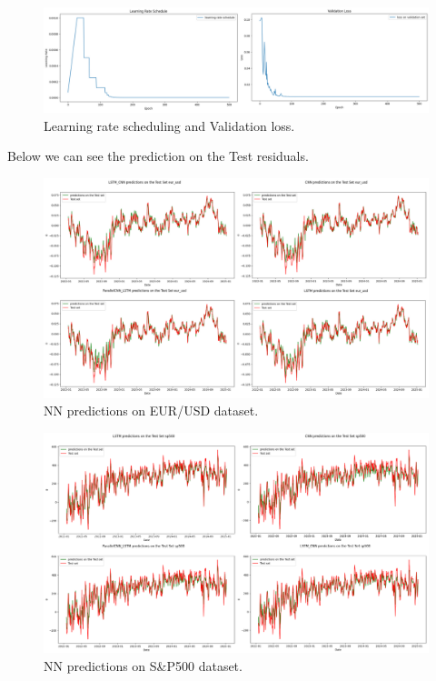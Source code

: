   \begin{figure}[H]
    \centering
    \includegraphics[width=1\textwidth]{Machine_learning_thesis/Images/NN training.png}
    \caption{Learning rate scheduling and Validation loss.} 
    \label{fig:NN training}
\end{figure}
Below we can see the prediction on the Test residuals.
  \begin{figure}[H]
    \centering
    \includegraphics[width=1\textwidth]{Machine_learning_thesis/Images/NN predictions EURUSD.png}
    \caption{NN predictions on EUR/USD dataset.} 
    \label{fig:NN predictions EURUSD}
\end{figure}
  \begin{figure}[H]
    \centering
    \includegraphics[width=1\textwidth]{Machine_learning_thesis/Images/NN predictions S&P500.png}
    \caption{NN predictions on S\&P500 dataset.} 
    \label{fig:NN predictions S&P500}
\end{figure}



